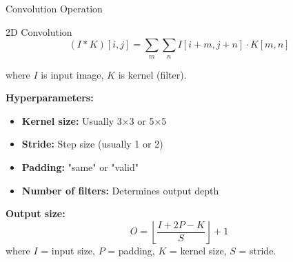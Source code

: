 \documentclass[aspectratio=169]{beamer}
\begin{document}
\begin{frame}{Convolution Operation}
  \begin{definitionbox}{2D Convolution}
    \begin{equation}
      (I * K)[i,j] = \sum_m \sum_n I[i+m, j+n] \cdot K[m, n]
    \end{equation}

    where $I$ is input image, $K$ is kernel (filter).
  \end{definitionbox}

  \vspace{0.5em}

  \textbf{Hyperparameters:}
  \begin{itemize}
    \item \textbf{Kernel size:} Usually 3×3 or 5×5
    \item \textbf{Stride:} Step size (usually 1 or 2)
    \item \textbf{Padding:} "same" or "valid"
    \item \textbf{Number of filters:} Determines output depth
  \end{itemize}

  \vspace{0.5em}

  \textbf{Output size:}
  \begin{equation}
    O = \left\lfloor \frac{I + 2P - K}{S} \right\rfloor + 1
  \end{equation}
  where $I$ = input size, $P$ = padding, $K$ = kernel size, $S$ = stride.
\end{frame}
\end{document}
